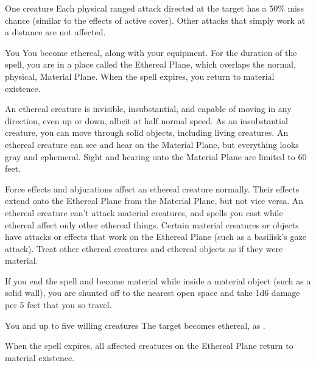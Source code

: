 \spelldur{\durshort \dismissable}
\begin{spelltarget}{One creature}
    \spelleffect Each physical ranged attack directed at the target has a 50\% miss chance (similar to the effects of active cover). Other attacks that simply work at a distance are not affected.
\end{spelltarget}

\spelldur{\durshort \dismissable}
\begin{spelltarget}{You}
    \spelleffect You become ethereal, along with your equipment. For the duration of the spell, you are in a place called the Ethereal Plane, which overlaps the normal, physical, Material Plane. When the spell expires, you return to material existence.
    \par An ethereal creature is invisible, insubstantial, and capable of moving in any direction, even up or down, albeit at half normal speed. As an insubstantial creature, you can move through solid objects, including living creatures. An ethereal creature can see and hear on the Material Plane, but everything looks gray and ephemeral. Sight and hearing onto the Material Plane are limited to 60 feet.
    \par Force effects and abjurations affect an ethereal creature normally. Their effects extend onto the Ethereal Plane from the Material Plane, but not vice versa. An ethereal creature can't attack material creatures, and spells you cast while ethereal affect only other ethereal things. Certain material creatures or objects have attacks or effects that work on the Ethereal Plane (such as a basilisk's gaze attack). Treat other ethereal creatures and ethereal objects as if they were material. 
    \par If you end the spell and become material while inside a material object (such as a solid wall), you are shunted off to the nearest open space and take 1d6 damage per 5 feet that you so travel.
\end{spelltarget}

\begin{spelltarget}{You and up to five willing creatures}
    \spelleffect The target becomes ethereal, as .
\end{spelltarget}
\spellnotes When the spell expires, all affected creatures on the Ethereal Plane return to material existence.

